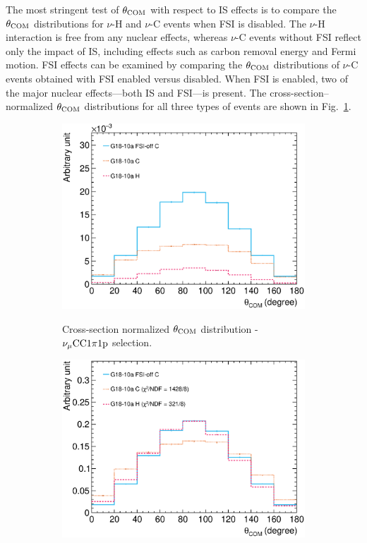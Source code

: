      The most stringent test of $\theta_{\textrm{COM}}$ with respect to IS effects is to compare the $\theta_{\textrm{COM}}$ distributions for $\nu$-H and $\nu$-C events when FSI is disabled.
     The $\nu$-H interaction is free from any nuclear effects, whereas $\nu$-C events without FSI reflect only the impact of IS, including effects such as carbon removal energy and Fermi motion.
     FSI effects can be examined by comparing the $\theta_{\textrm{COM}}$ distributions of $\nu$-C events obtained with FSI enabled versus disabled.
     When FSI is enabled, two of the major nuclear effects—both IS and FSI—is present.
     The cross-section–normalized $\theta_{\textrm{COM}}$ distributions for all three types of events are shown in Fig.~\ref{subfig:ch-comp-xnorm}.
     \begin{figure}
     \centering
     \begin{subfigure}[ht!]{\trfigwid\textwidth}
          \centering
          \includegraphics[width=\textwidth]{figures/COM/xnorm-CH-lfgdef_da_tan.eps} \\
          \caption{Cross-section normalized $\theta_{\textrm{COM}}$ distribution - $\nu_{\mu}\textrm{CC}1\pi1\textrm{p}$ selection.}
          \label{subfig:ch-comp-xnorm}
     \end{subfigure}
     \begin{subfigure}[ht!]{\trfigwid\textwidth}
          \centering
          \includegraphics[width=\textwidth]{figures/COM/anorm-CH-lfgdef_da_tan.eps}     

\end{subfigure}
\end{figure}
